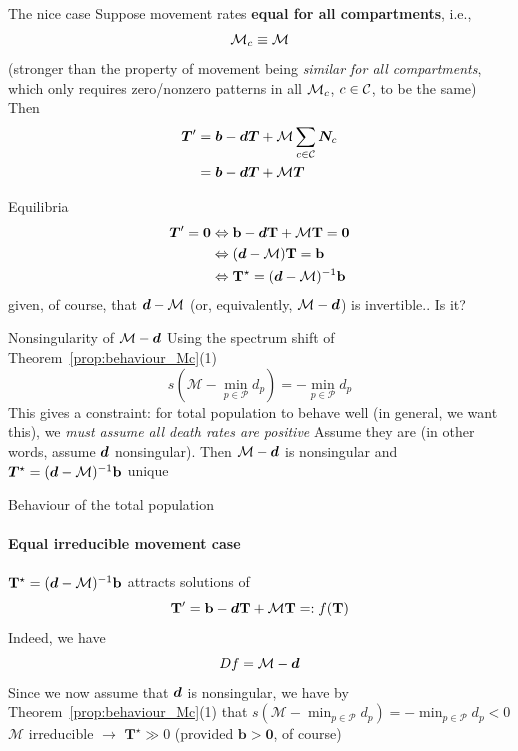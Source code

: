 \documentclass[aspectratio=169]{beamer}\usepackage[]{graphicx}\usepackage[]{xcolor}
\begin{document}
\begin{frame}{The nice case}
Suppose movement rates \textbf{equal for all compartments}, i.e.,
$$
\mathcal{M}_c\equiv\mathcal{M}
$$
\vfill
(stronger than the property of movement being \emph{similar for all compartments}, which only requires zero/nonzero patterns in all $\mathcal{M}_c$, $c\in\mathcal{C}$, to be the same)
\vfill
Then
\begin{align}
\bm{T}' &= \bm{b}-\bm{d}\bm{T}+\mathcal{M}\sum_{c\in\mathcal{C}}\bm{N}_{c} \nonumber \\
&= \bm{b}-\bm{d}\bm{T}+\mathcal{M}\bm{T} \label{sys:pSLIRS_toy_dN}
\end{align}
\end{frame}


\begin{frame}{Equilibria}
$$
\begin{aligned}
\bT'=\b0 &\Leftrightarrow \mathbf{b}-\bd\mathbf{T}+\mathcal{M}\mathbf{T}=\mathbf{0} \\
&\Leftrightarrow (\bd-\mathcal{M})\mathbf{T}=\mathbf{b} \\
&\Leftrightarrow \mathbf{T}^\star=(\bd-\mathcal{M})^{-1}\mathbf{b}
\end{aligned}
$$
given, of course, that $\bm{d}-\mathcal{M}$ (or, equivalently, $\mathcal{M}-\bm{d}$) is invertible.. 
\vfill
Is it?
\end{frame}

\begin{frame}{Nonsingularity of $\mathcal{M}-\bm{d}$}
Using the spectrum shift of Theorem~\ref{prop:behaviour_Mc}{(1)}
\[
s\left(\mathcal{M}-\min_{p\in\mathcal{P}}d_p\right)=-\min_{p\in\mathcal{P}}d_p
\]
This gives a constraint: for total population to behave well (in general, we want this), we \emph{must assume all death rates are positive}
\vfill
Assume they are (in other words, assume $\bm{d}$ nonsingular). Then $\mathcal{M}-\bm{d}$ is nonsingular and $\bm{T}^\star=(\bm{d}-\mathcal{M})^{-1}\mathbf{b}$ unique
\end{frame}


\begin{frame}{Behaviour of the total population}
\framesubtitle{Equal irreducible movement case}
$\mathbf{T}^\star=(\bm{d}-\mathcal{M})^{-1}\mathbf{b}$ attracts solutions of
$$
\mathbf{T}'=\mathbf{b}-\bm{d}\mathbf{T}+\mathcal{M}\mathbf{T}=:f(\mathbf{T})
$$
\vfill
Indeed, we have
$$
Df=\mathcal{M}-\bm{d}
$$
\vfill
Since we now assume that $\bm{d}$ is nonsingular, we have by Theorem~\ref{prop:behaviour_Mc}{(1)} that $s(\mathcal{M}-\min_{p\in\mathcal{P}}d_p)=-\min_{p\in\mathcal{P}}d_p<0$
\vfill
$\mathcal{M}$ irreducible $\rightarrow$ $\mathbf{T}^\star\gg 0$ (provided $\mathbf{b}>\mathbf{0}$, of course)
\end{frame}
\end{document}
